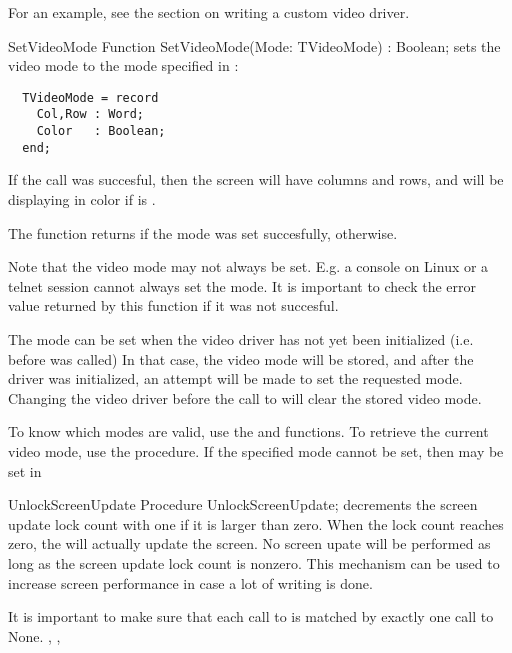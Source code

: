 For an example, see the section on writing a custom video driver.

\begin{function}{SetVideoMode}
\Declaration
Function SetVideoMode(Mode: TVideoMode) : Boolean;
\Description
{} sets the video mode to the mode specified in :
\begin{verbatim}
  TVideoMode = record
    Col,Row : Word;
    Color   : Boolean;
  end;
\end{verbatim}
If the call was succesful, then the screen will have  columns and
 rows, and will be displaying in color if  is
. 

The function returns  if the mode was set succesfully, 
otherwise.

Note that the video mode may not always be set. E.g. a console on Linux
or a telnet session cannot always set the mode. It is important to check
the error value returned by this function if it was not succesful.

The mode can be set when the video driver has not yet been initialized
(i.e. before  was called) In that case, the video mode will
be stored, and after the driver was initialized, an attempt will be made to
set the requested mode. Changing the video driver before the call to
 will clear the stored video mode.

To know which modes are valid, use the  and
 functions. To retrieve the current video mode, 
use the  procedure.
\Errors
If the specified mode cannot be set, then  may be set
in 
\SeeAlso
{}
\end{function}

\begin{procedure}{UnlockScreenUpdate}
\Declaration
Procedure UnlockScreenUpdate;
\Description
{} decrements the screen update lock count with one if
it is larger than zero. When the lock count reaches zero, the 
 will actually update the screen. No screen upate will 
be performed as long as the screen update lock count is nonzero. This 
mechanism can be used to increase screen performance in case a lot of 
writing is done. 

It is important to make sure that each call to  is
matched by exactly one call to 
\Errors
None.
\SeeAlso
{}, , 
\end{procedure}

